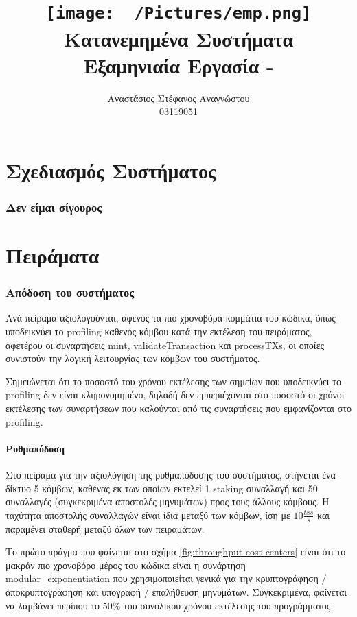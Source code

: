 \documentclass{article}
\title{
    \texttt{[image: ~/Pictures/emp.png]} \\
    \vskip 5cm
    Κατανεμημένα Συστήματα \\
    \large Εξαμηνιαία Εργασία - \eng{BlockChat} 
    \vskip 5cm
}
\author{ Αναστάσιος Στέφανος Αναγνώστου \\ \large 03119051 }
\newcommand{\eng}[1]{\foreignlanguage{english}{#1}} %
\begin{document}
\maketitle \clearpage \tableofcontents \clearpage

\part{Σχεδιασμός Συστήματος}

\section{Δεν είμαι σίγουρος}

\clearpage
\part{Πειράματα}

\section{Απόδοση του συστήματος}

Ανά πείραμα αξιολογούνται, αφενός τα πιο χρονοβόρα κομμάτια του κώδικα, όπως
υποδεικνύει το \eng{profiling} καθενός κόμβου κατά την εκτέλεση του πειράματος,
αφετέρου οι συναρτήσεις \eng{mint}, \eng{validateTransaction} και
\eng{processTXs}, οι οποίες συνιστούν την λογική λειτουργίας των κόμβων του
συστήματος.

Σημειώνεται ότι το ποσοστό του χρόνου εκτέλεσης των σημείων που υποδεικνύει το
\eng{profiling} δεν είναι κληρονομημένο, δηλαδή δεν εμπεριέχονται στο ποσοστό
οι χρόνοι εκτέλεσης των συναρτήσεων που καλούνται από τις συναρτήσεις που
εμφανίζονται στο \eng{profiling}.

\subsection{Ρυθμαπόδοση}

Στο πείραμα για την αξιολόγηση της ρυθμαπόδοσης του συστήματος, στήνεται ένα
δίκτυο 5 κόμβων, καθένας εκ των οποίων εκτελεί 1 \eng{staking} συναλλαγή και 50
συναλλαγές (συγκεκριμένα αποστολές μηνυμάτων) προς τους άλλους κόμβους. Η
ταχύτητα αποστολής συναλλαγών είναι ίδια μεταξύ των κόμβων, ίση με
$10\frac{txs}{s}$ και παραμένει σταθερή μεταξύ όλων των πειραμάτων.

Το πρώτο πράγμα που φαίνεται στο σχήμα \ref{fig:throughput-cost-centers} είναι
ότι το μακράν πιο χρονοβόρο μέρος του κώδικα είναι η συνάρτηση
\eng{modular\_exponentiation} που χρησιμοποιείται γενικά για την κρυπτογράφηση
/ αποκρυπτογράφηση και υπογραφή / επαλήθευση μηνυμάτων. Συγκεκριμένα, φαίνεται
να λαμβάνει περίπου το 50\% του συνολικού χρόνου εκτέλεσης του προγράμματος.
\end{document}

